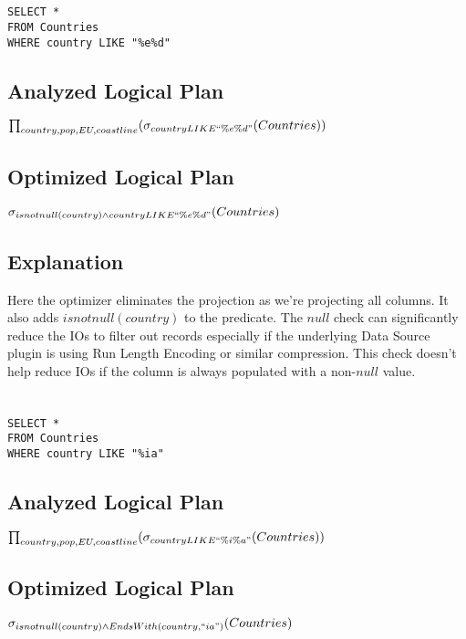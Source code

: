 \documentclass[12pt]{article}
\begin{document}
\newpage

\section{}
\begin{verbatim}
SELECT *
FROM Countries
WHERE country LIKE "%e%d"
\end{verbatim}

\subsection*{Analyzed Logical Plan}
$\prod_{country, pop, EU, coastline}(\sigma_{country LIKE ``\%e\%d"}(Countries))$

\subsection*{Optimized Logical Plan}
$\sigma_{isnotnull(country) \wedge country LIKE ``\%e\%d"}(Countries)$

\subsection*{Explanation}

Here the optimizer eliminates the projection as we're projecting all columns. It also adds $isnotnull(country)$ to the predicate. The $null$ check can significantly reduce the IOs to filter out records especially if the underlying Data Source plugin is using Run Length Encoding or similar compression. This check doesn't help reduce IOs if the column is always populated with a non-$null$ value.

\newpage

\section{}
\begin{verbatim}
SELECT *
FROM Countries
WHERE country LIKE "%ia"
\end{verbatim}

\subsection*{Analyzed Logical Plan}
$\prod_{country, pop, EU, coastline}(\sigma_{country LIKE ``\%i\%a"}(Countries))$


\subsection*{Optimized Logical Plan}
$\sigma_{isnotnull(country) \wedge EndsWith(country, ``ia")}(Countries)$
\end{document}
